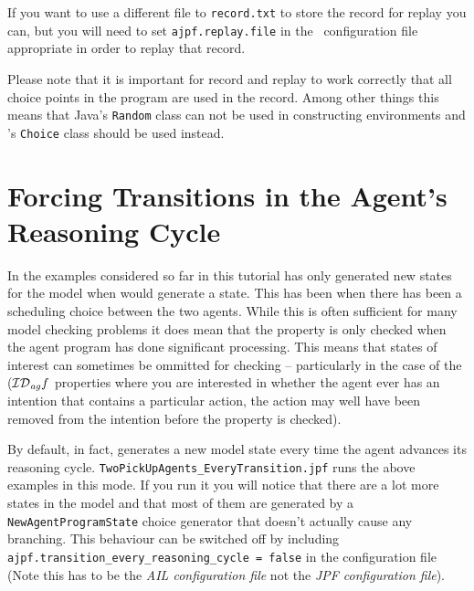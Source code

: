 If you want to use a different file to \texttt{record.txt} to store the record for replay you can, but you will need to set \texttt{ajpf.replay.file} in the \ail\ configuration file appropriate in order to replay that record.

Please note that it is important for record and replay to work correctly that all choice points in the program are used in the record.  Among other things this means that Java's \texttt{Random} class can not be used in constructing environments and \ajpf's \texttt{Choice} class should be used instead.  

\section{Forcing Transitions in the Agent's Reasoning Cycle}
In the examples considered so far in this tutorial \ajpf{} has only generated new states for the model when \jpf{} would generate a state.  This has been when there has been a scheduling choice between the two agents.  While this is often sufficient for many model checking problems it does mean that the property is only checked when the agent program has done significant processing.  This means that states of interest can sometimes be ommitted for checking -- particularly in the case of the ($\mathrm{{\cal ID}}_{\mathit{ag}} f$\index{$\lintendtodofunc$} properties where you are interested in whether the agent ever has an intention that contains a particular action, the action may well have been removed from the intention before the property is checked).

\begin{sloppypar}
By default, in fact, \ajpf{} generates a new model state every time the agent advances its reasoning cycle.  \texttt{TwoPickUpAgents\_EveryTransition.jpf} runs the above examples in this mode.  If you run it you will notice that there are a lot more states in the model and that most of them are generated by a \texttt{NewAgentProgramState} choice generator that doesn't actually cause any branching.  This behaviour can be switched off by including \texttt{ajpf.transition\_every\_reasoning\_cycle = false} in the \ail{} configuration file (Note this has to be the \emph{AIL configuration file} not the \emph{JPF configuration file}).
\end{sloppypar}


